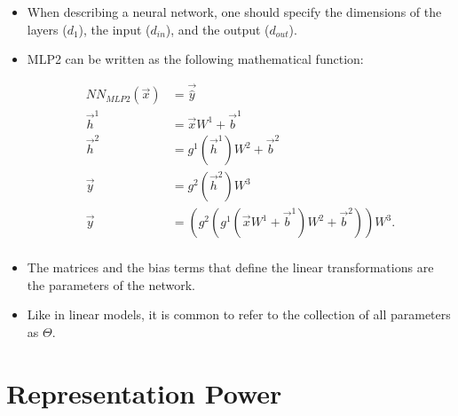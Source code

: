 \begin{itemize}
\item When describing a neural network, one should specify the dimensions of the layers ($d_{1}$), the input ($d_{in}$), and the output ($d_{out}$).
\item MLP2 can be written as the following mathematical function:
\begin{center}
\begin{equation}
\begin{split}
NN_{MLP2}(\vec{x}) & =  \vec{\hat{y}}  \\
\vec{h}^{1} &  = \vec{x}W^{1}+\vec{b}^{1} \\
\vec{h}^{2} &  = g^{1}(\vec{h}^{1})W^{2}+\vec{b}^{2} \\
\vec{y} &  = g^{2}(\vec{h}^{2})W^{3}\\
\vec{y} &  = (g^2(g^1(\vec{x}W^{1}+\vec{b}^{1})W^2+\vec{b}^2))W^3.\\
\end{split}
\end{equation}
\end{center}
\item The matrices and the bias terms that define the linear transformations are the parameters of the network. 
\item Like in linear models, it is common to refer to the collection of all parameters as $\Theta$.
\end{itemize}



\section{Representation Power}

